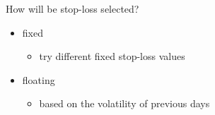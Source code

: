 \documentclass[final,2p]{elsarticle}
\begin{document}
How will be stop-loss selected?
\begin{itemize}
    \item fixed
        \begin{itemize}
            \item try different fixed stop-loss values
        \end{itemize}
    \item floating
        \begin{itemize}
            \item based on the volatility of previous days
        \end{itemize}
\end{itemize}
\end{document}
